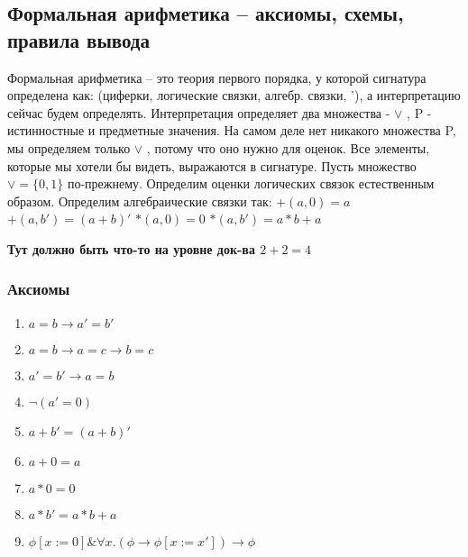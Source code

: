 \subsection{Формальная арифметика -- аксиомы, схемы, правила вывода}
\label{sec-9-3}
Формальная арифметика -- это теория первого порядка, у которой
сигнатура определена как: (циферки, логические связки, алгебр.
связки, '), а интерпретацию сейчас будем определять.
Интерпретация определяет два множества - $\lor$ , P - истинностные и
предметные значения. На самом деле нет никакого множества P,
мы определяем только $\lor$ , потому что оно нужно для оценок. Все
элементы, которые мы хотели бы видеть, выражаются в сигнатуре.
Пусть множество $\lor = \lbrace 0, 1 \rbrace$ по-прежнему.
Определим оценки логических связок естественным образом.
Определим алгебраические связки так:
$+(a, 0) = a$
$+(a, b') = (a + b)'$
$*(a, 0) = 0$
$*(a, b') = a * b + a$

\textbf{Тут должно быть что-то на уровне док-ва $2+2=4$}
\subsubsection{Аксиомы}
\label{sec-9-3-1}
\begin{enumerate}
\item $a = b \to a' = b'$
\item $a = b \to a = c \to b = c$
\item $a' = b' \to a = b$
\item $\lnot (a' = 0)$
\item $a + b' = (a + b)'$
\item $a + 0 = a$
\item $a * 0 = 0$
\item $a * b' = a * b + a$
\item $\phi[x:=0] \& \forall x.(\phi \to \phi[x:=x']) \to \phi$
\end{enumerate}
